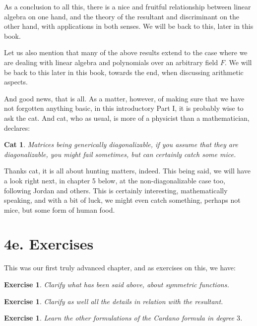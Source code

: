 \documentclass[12pt]{amsbook}
\newtheorem{cat}[theorem]{Cat}
\newtheorem{exercise}[theorem]{Exercise}
\begin{document}
As a conclusion to all this, there is a nice and fruitful relationship between linear algebra on one hand, and the theory of the resultant and discriminant on the other hand, with applications in both senses. We will be back to this, later in this book.

\bigskip

Let us also mention that many of the above results extend to the case where we are dealing with linear algebra and polynomials over an arbitrary field $F$. We will be back to this later in this book, towards the end, when discussing arithmetic aspects.

\bigskip

And good news, that is all. As a matter, however, of making sure that we have not forgotten anything basic, in this introductory Part I, it is probably wise to ask the cat. And cat, who as usual, is more of a physicist than a mathematician, declares:

\begin{cat}
Matrices being generically diagonalizable, if you assume that they are diagonalizable, you might fail sometimes, but can certainly catch some mice.
\end{cat}

Thanks cat, it is all about hunting matters, indeed. This being said, we will have a look right next, in chapter 5 below, at the non-diagonalizable case too, following Jordan and others. This is certainly interesting, mathematically speaking, and with a bit of luck, we might even catch something, perhaps not mice, but some form of human food.

\section*{4e. Exercises}

This was our first truly advanced chapter, and as exercises on this, we have:

\begin{exercise}
Clarify what has been said above, about symmetric functions.
\end{exercise}

\begin{exercise}
Clarify as well all the details in relation with the resultant.
\end{exercise}

\begin{exercise}
Learn the other formulations of the Cardano formula in degree $3$.
\end{exercise}
\end{document}
